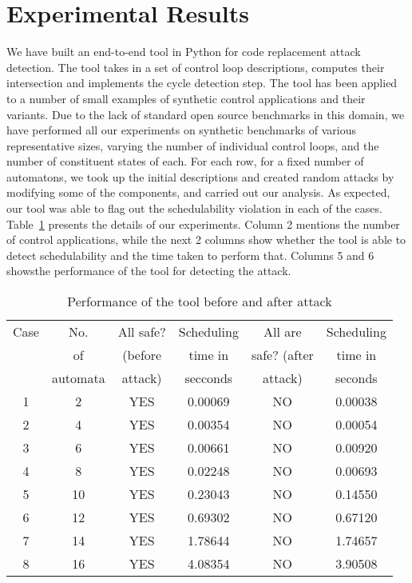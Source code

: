 \section{Experimental Results} \label{sec5}
\noindent
We have built an end-to-end tool in Python for code replacement attack detection.
The tool takes in a set of control loop descriptions, computes their intersection and 
implements the cycle detection step. The tool has been applied to a number of small 
examples of synthetic control applications and their variants. Due to the lack of standard open
source benchmarks in this domain, we have performed all our experiments on synthetic benchmarks of 
various representative sizes, varying the number of individual control loops, and the number of constituent states of each.
For each row, for a fixed number of automatons, we took up the initial descriptions and created random attacks by modifying some of the components, and carried out our analysis. As expected, our tool was able to flag out the
schedulability violation in each of the cases. Table~\ref{table:nonlin} presents the details of our experiments.
Column 2 mentions the number of control applications, 
while the next 2 columns show whether the tool is able to detect schedulability and the time taken to perform that. Columns 5 and 6 showsthe performance of the tool for detecting the attack.

\begin{table}[ht]
\caption{Performance of the tool before and after attack}
\centering
\begin{tabular}{|c | c | c | c | c | c|}
\hline %
Case & No.           &  All safe?       & Scheduling   & All are       &Scheduling  \\       
     & of            &  (before   & time in      & safe? (after   &time in            \\  
     & automata      &  attack)        & secconds     & attack)      &seconds    \\
\hline
\hline
1 & 2 & YES & 0.00069 & NO & 0.00038\\

2 & 4  & YES & 0.00354 & NO &  0.00054 \\

3 & 6  & YES & 0.00661 & NO & 0.00920 \\

4 & 8 & YES &  0.02248 & NO & 0.00693 \\

5 & 10 & YES & 0.23043 & NO & 0.14550 \\

6 & 12 & YES & 0.69302 & NO & 0.67120 \\

7 & 14 & YES & 1.78644 & NO & 1.74657 \\

8 & 16 & YES & 4.08354 & NO & 3.90508 \\

\hline

\end{tabular}
\label{table:nonlin}

\end{table}

